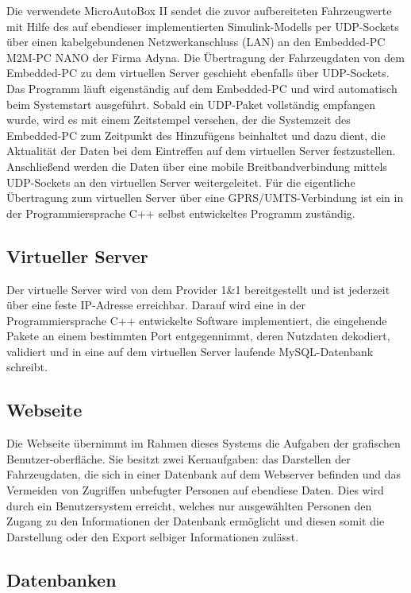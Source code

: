 \documentclass[fontsize = 12pt, paper = a4]{scrreprt}
\begin{document}
Die verwendete MicroAutoBox II sendet die zuvor aufbereiteten Fahrzeugwerte mit Hilfe des auf ebendieser implementierten Simulink-Modells per UDP-Sockets über einen kabelgebundenen Netzwerkanschluss (LAN) an den Embedded-PC M2M-PC NANO der Firma Adyna. Die Übertragung der Fahrzeugdaten von dem Embedded-PC zu dem virtuellen Server geschieht ebenfalls über UDP-Sockets. Das Programm läuft eigenständig auf dem Embedded-PC und wird automatisch beim Systemstart ausgeführt. Sobald ein UDP-Paket vollständig empfangen wurde, wird es mit einem Zeitstempel versehen, der die Systemzeit des Embedded-PC zum Zeitpunkt des Hinzufügens beinhaltet und dazu dient, die Aktualität der Daten bei dem Eintreffen auf dem virtuellen Server festzustellen. Anschließend werden die Daten über eine mobile Breitbandverbindung mittels UDP-Sockets an den virtuellen Server weitergeleitet. Für die eigentliche Übertragung zum virtuellen Server über eine GPRS/UMTS-Verbindung ist ein in der Programmiersprache C++ selbst entwickeltes Programm zuständig.		

\subsection{Virtueller Server}

Der virtuelle Server wird von dem Provider 1\&1 bereitgestellt und ist jederzeit über eine feste IP-Adresse erreichbar. Darauf wird eine in der Programmiersprache C++ entwickelte Software implementiert, die eingehende Pakete an einem bestimmten Port entgegennimmt, deren Nutzdaten dekodiert, validiert und in eine auf dem virtuellen Server laufende MySQL-Datenbank schreibt. 

\subsection{Webseite}

Die Webseite übernimmt im Rahmen dieses Systems die Aufgaben der grafischen Benutzer-oberfläche. Sie besitzt zwei Kernaufgaben: das Darstellen der Fahrzeugdaten, die sich in einer Datenbank auf dem Webserver befinden und das Vermeiden von Zugriffen unbefugter Personen auf ebendiese Daten. Dies wird durch ein Benutzersystem erreicht, welches nur ausgewählten Personen den Zugang zu den Informationen der Datenbank ermöglicht und diesen somit die Darstellung oder den Export selbiger Informationen zulässt.

\newpage


\subsection{Datenbanken}
\end{document}
